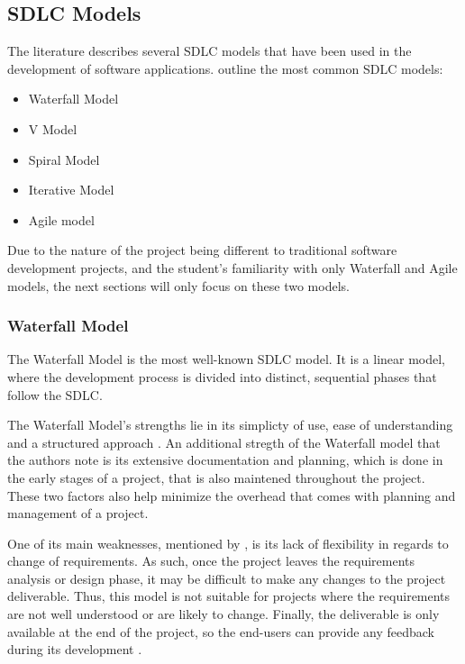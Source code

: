 \newpage

\subsection{SDLC Models}

The literature describes several SDLC models that have been used in the development of software applications. \textcite{sdlc1, sdlc2} outline the most common SDLC models:
\begin{itemize}
    \item Waterfall Model
    \item V Model
    \item Spiral Model
    \item Iterative Model
    \item Agile model
\end{itemize}

Due to the nature of the project being different to traditional software development projects, and the student's familiarity with only Waterfall and Agile models, the next sections will only focus on these two models.

\subsubsection{Waterfall Model}

The Waterfall Model is the most well-known SDLC model. It is a linear model, where the development process is divided into distinct, sequential phases that follow the SDLC.

The Waterfall Model's strengths lie in its simplicty of use, ease of understanding and a structured approach \parencite{waterfall}. An additional stregth of the Waterfall model that the authors note is its extensive documentation and planning, which is done in the early stages of a project, that is also maintened throughout the project. These two factors also help minimize the overhead that comes with planning and management of a project.

One of its main weaknesses, mentioned by \textcite{waterfall}, is its lack of flexibility in regards to change of requirements. As such, once the project leaves the requirements analysis or design phase, it may be difficult to make any changes to the project deliverable. Thus, this model is not suitable for projects where the requirements are not well understood or are likely to change. Finally, the deliverable is only available at the end of the project, so the end-users can provide any feedback during its development \parencite{waterfall}.

